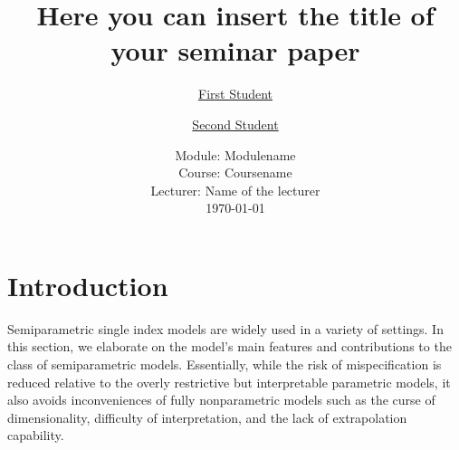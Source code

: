 \documentclass[a4paper]{article}
\begin{document}
	\title{
	\vspace{1cm}
	\Huge Here you can insert the title of \\ your seminar paper \\
	}
	
	\vspace{1cm}
	
	
	\author{\Large \href{mailto:first.student@smail.fh-koeln.de}{First Student} \and \Large \href{mailto:second.student@smail.fh-koeln.de}{Second Student}
	\vspace{1cm}}
	
	\date{
	\large Module: Modulename \\ Course: Coursename \\ 
	\vspace{0.8cm}
	\large Lecturer: Name of the lecturer \\
	\vspace{1cm}
	\today
	}

	\maketitle
	\setlength{\parindent}{0pt}

\vspace{2cm}
\begin{abstract}


\end{abstract}
	\newpage
	\tableofcontents
	\newpage
	
\section{Introduction} %
\label{sec:introduction}

Semiparametric single index models are widely used in a variety of settings.
In this section, we elaborate on the model's main features and contributions to the class of semiparametric models.  
Essentially, while the risk of mispecification is reduced relative to the overly restrictive but interpretable parametric models, it also avoids inconveniences of fully nonparametric models such as the curse of dimensionality, difficulty of interpretation, and the lack of extrapolation capability.
\end{document}
